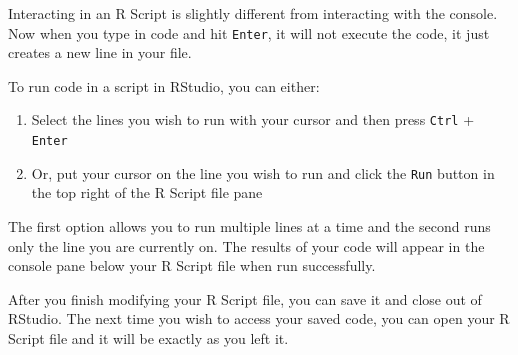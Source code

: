 \documentclass[
]{book}
\providecommand{\tightlist}{%
  \setlength{\itemsep}{0pt}\setlength{\parskip}{0pt}}
\begin{document}
Interacting in an R Script is slightly different from interacting with the console. Now when you type in code and hit \texttt{Enter}, it will not execute the code, it just creates a new line in your file.

To run code in a script in RStudio, you can either:

\begin{enumerate}
\def\labelenumi{\arabic{enumi}.}
\tightlist
\item
  Select the lines you wish to run with your cursor and then press \texttt{Ctrl} + \texttt{Enter}
\item
  Or, put your cursor on the line you wish to run and click the \texttt{Run} button in the top right of the R Script file pane
\end{enumerate}

The first option allows you to run multiple lines at a time and the second runs only the line you are currently on. The results of your code will appear in the console pane below your R Script file when run successfully.

After you finish modifying your R Script file, you can save it and close out of RStudio. The next time you wish to access your saved code, you can open your R Script file and it will be exactly as you left it.

  
\end{document}
